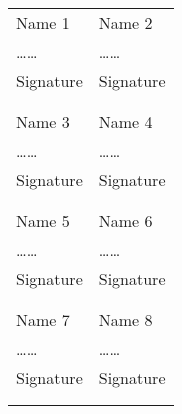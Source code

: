 \documentclass{article}
\begin{document}
\noindent
\begin{tabular}{p{70mm}p{70mm}}

%
%

Name 1 & Name 2 \\
\dots\dotfill\dots & \dots\dotfill\dots \\
Signature & Signature \\
& \\
& \\

Name 3 & Name 4 \\
\dots\dotfill\dots & \dots\dotfill\dots \\
Signature & Signature \\
& \\
& \\

Name 5 & Name 6 \\
\dots\dotfill\dots & \dots\dotfill\dots \\
Signature & Signature \\
& \\
& \\

Name 7 & Name 8 \\
\dots\dotfill\dots & \dots\dotfill\dots \\
Signature & Signature \\
& \\
& \\
\end{tabular}
\end{document}
